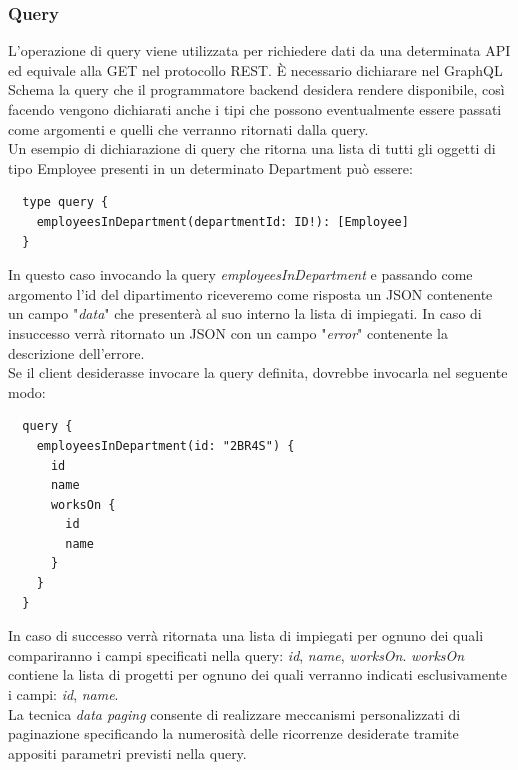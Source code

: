 \subsubsection{Query}
L'operazione di query viene utilizzata per richiedere dati da una determinata API ed equivale alla GET nel protocollo REST. È necessario dichiarare nel GraphQL Schema la query che il programmatore backend desidera rendere disponibile, così facendo vengono dichiarati anche i tipi che possono eventualmente essere passati come argomenti e quelli che verranno ritornati dalla query.\\
Un esempio di dichiarazione di query che ritorna una lista di tutti gli oggetti di tipo Employee presenti in un determinato Department può essere:
\begin{verbatim}
  type query {
    employeesInDepartment(departmentId: ID!): [Employee]
  }
\end{verbatim}
In questo caso invocando la query \textit{employeesInDepartment} e passando come argomento l'id del dipartimento riceveremo come risposta un JSON contenente un campo "\textit{data}" che presenterà al suo interno la lista di impiegati. In caso di insuccesso verrà ritornato un JSON con un campo "\textit{error}" contenente la descrizione dell'errore.\\
Se il client desiderasse invocare la query definita, dovrebbe invocarla nel seguente modo:
\begin{verbatim}
  query {
    employeesInDepartment(id: "2BR4S") {
      id
      name
      worksOn {
        id
        name
      }
    }
  }
\end{verbatim}
In caso di successo verrà ritornata una lista di impiegati per ognuno dei quali compariranno i campi specificati nella query: \textit{id}, \textit{name}, \textit{worksOn}. \textit{worksOn} contiene la lista di progetti per ognuno dei quali verranno indicati esclusivamente i campi: \textit{id}, \textit{name}.\\
La tecnica \textit{data paging} consente di realizzare meccanismi personalizzati di paginazione specificando la numerosità delle ricorrenze desiderate tramite appositi parametri previsti nella query.
